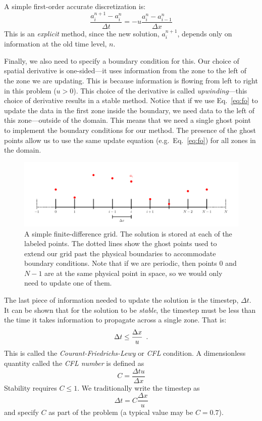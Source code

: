 \documentclass[11pt]{article}
\begin{document}
A simple first-order accurate discretization is:
\begin{equation}
\frac{a_i^{n+1} - a_i^n}{\Delta t} = - u \frac{a_i^n - a_{i-1}^n}{\Delta x}
\label{eq:fo}
\end{equation}
This is an {\em explicit} method, since the new solution, $a_i^{n+1}$,
depends only on information at the old time level, $n$.  

Finally, we also need to specify a boundary condition for this.  Our
choice of spatial derivative is one-sided---it uses information from
the zone to the left of the zone we are updating.  This is because
information is flowing from left to right in this problem ($u > 0$).
This choice of the derivative is called {\em upwinding}---this choice
of derivative results in a stable method.
Notice that if we use Eq.~\ref{eq:fo} to update the data in the first
zone inside the boundary, we need data to the left of this
zone---outside of the domain.  This means that we need a single
ghost point to implement the boundary conditions for our method.  The
presence of the ghost points allow us to use the same update equation
(e.g.\ Eq.~\ref{eq:fo}) for all zones in the domain.


\begin{figure}[t]
\centering
\includegraphics[width=7.0in]{fd_ghost}
\caption{\label{fig:fdgrid} A simple finite-difference grid.  The solution
  is stored at each of the labeled points.  The dotted lines show the
  ghost points used to extend our grid past the physical boundaries to 
  accommodate boundary conditions.  Note that if we are periodic, then
  points $0$ and $N-1$ are at the same physical point in space, so we
  would only need to update one of them.}
\end{figure}

The last piece of information needed to update the solution is the
timestep, $\Delta t$.  It can be shown that for the solution to be
{\em stable}, the timestep must be less than the time it takes information
to propagate across a single zone.  That is:
\begin{equation}
\Delta t \le \frac{\Delta x}{u} \enskip .
\end{equation}
This is called the {\em Courant-Friedrichs-Lewy} or {\em CFL}
condition.  A dimensionless quantity called the {\em CFL number} is 
defined as 
\begin{equation}
C = \frac{\Delta t u }{\Delta x} 
\end{equation}
Stability requires $C \le 1$.
%
We traditionally write the timestep as
\begin{equation}
\label{eq:timestep}
\Delta t = C \frac{\Delta x}{u}
\end{equation}
and specify $C$ as part of the problem (a typical value may be $C = 0.7$).
\end{document}
